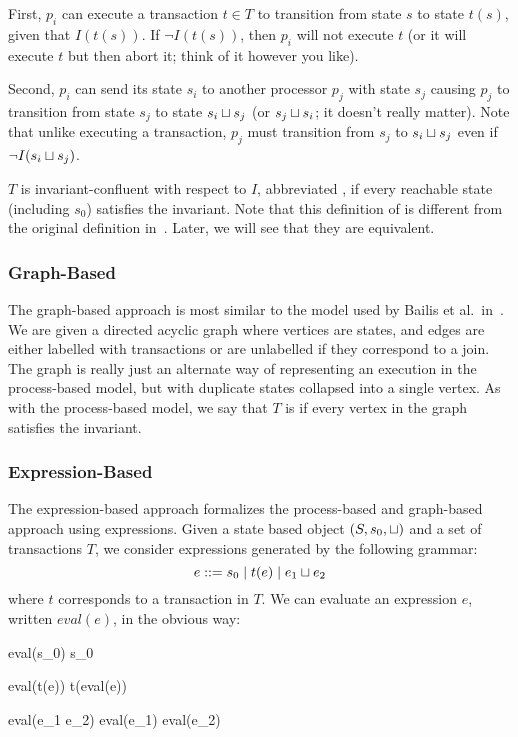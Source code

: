 First, $p_i$ can execute a transaction $t \in T$ to transition from state $s$
to state $t(s)$, given that $I(t(s))$. If $\lnot I(t(s))$, then $p_i$ will not
execute $t$ (or it will execute $t$ but then abort it; think of it however you
like).

Second, $p_i$ can send its state $s_i$ to another processor $p_j$ with state
$s_j$ causing $p_j$ to transition from state $s_j$ to state $s_i \sqcup s_j$ (or
$s_j \sqcup s_i$; it doesn't really matter). Note that unlike executing a
transaction, $p_j$ must transition from $s_j$ to $s_i \sqcup s_j$ even if $\lnot
I(s_i \sqcup s_j)$.

$T$ is invariant-confluent with respect to $I$, abbreviated \Iconfluent{}, if
every reachable state (including $s_0$) satisfies the invariant. Note that this
definition of \Iconfluence{} is different from the original definition
in~\cite{bailis2014coordination}. Later, we will see that they are equivalent.

\subsubsection{Graph-Based}
The graph-based approach is most similar to the model used by Bailis et al.\
in~\cite{bailis2014coordination}. We are given a directed acyclic graph where
vertices are states, and edges are either labelled with transactions or are
unlabelled if they correspond to a join. The graph is really just an alternate
way of representing an execution in the process-based model, but with duplicate
states collapsed into a single vertex. As with the process-based model, we say
that $T$ is \Iconfluent{} if every vertex in the graph satisfies the invariant.

\subsubsection{Expression-Based}
The expression-based approach formalizes the process-based and graph-based
approach using expressions. Given a state based object $(S, s_0, \sqcup)$ and a
set of transactions $T$, we consider expressions generated by the following
grammar:
\[
  e ::= s_0 \mid t(e) \mid e_1 \sqcup e_2
\]
where $t$ corresponds to a transaction in $T$. We can evaluate an expression
$e$, written $eval(e)$, in the obvious way:
\begin{mathpar}
  eval(s_0)  s_0

  eval(t(e))  t(eval(e))

  eval(e_1 \join e_2)  eval(e_1) \join eval(e_2)
\end{mathpar}

